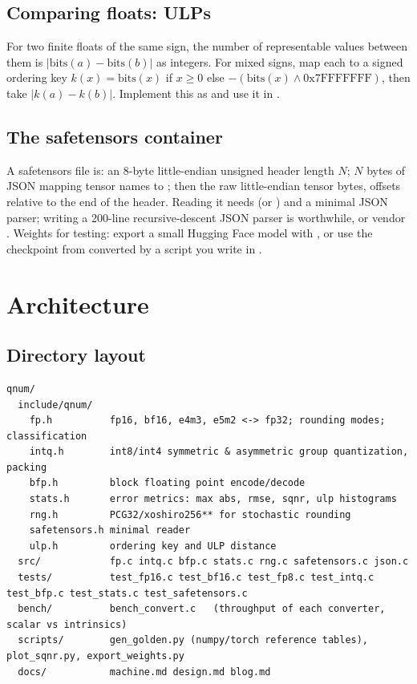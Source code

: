 \subsection{Comparing floats: ULPs}

For two finite floats of the same sign, the number of representable values between them is $|\text{bits}(a) - \text{bits}(b)|$ as integers. For mixed signs, map each to a signed ordering key $k(x) = \text{bits}(x)$ if $x \ge 0$ else $-(\text{bits}(x) \wedge \text{0x7FFFFFFF})$, then take $|k(a)-k(b)|$. Implement this as  and use it in .

\subsection{The safetensors container}

A safetensors file is: an 8-byte little-endian unsigned header length $N$; $N$ bytes of JSON mapping tensor names to ; then the raw little-endian tensor bytes, offsets relative to the end of the header. Reading it needs  (or ) and a minimal JSON parser; writing a 200-line recursive-descent JSON parser is worthwhile, or vendor . Weights for testing: export a small Hugging Face model with , or use the  checkpoint from  converted by a script you write in .

\section{Architecture}

\subsection{Directory layout}

\begin{lstlisting}[style=plain]
qnum/
  include/qnum/
    fp.h          fp16, bf16, e4m3, e5m2 <-> fp32; rounding modes; classification
    intq.h        int8/int4 symmetric & asymmetric group quantization, packing
    bfp.h         block floating point encode/decode
    stats.h       error metrics: max abs, rmse, sqnr, ulp histograms
    rng.h         PCG32/xoshiro256** for stochastic rounding
    safetensors.h minimal reader
    ulp.h         ordering key and ULP distance
  src/            fp.c intq.c bfp.c stats.c rng.c safetensors.c json.c
  tests/          test_fp16.c test_bf16.c test_fp8.c test_intq.c test_bfp.c test_stats.c test_safetensors.c
  bench/          bench_convert.c   (throughput of each converter, scalar vs intrinsics)
  scripts/        gen_golden.py (numpy/torch reference tables), plot_sqnr.py, export_weights.py
  docs/           machine.md design.md blog.md
\end{lstlisting}

